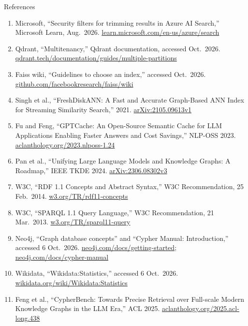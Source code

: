 \begin{frame}[allowframebreaks]{References}
\begin{enumerate}
    \item Microsoft, ``Security filters for trimming results in Azure AI Search,'' Microsoft Learn, Aug.\ 2026. \href{https://learn.microsoft.com/en-us/azure/search/search-security-trimming-for-azure-search}{learn.microsoft.com/en-us/azure/search}
    \item Qdrant, ``Multitenancy,'' Qdrant documentation, accessed Oct.\ 2026. \href{https://qdrant.tech/documentation/guides/multiple-partitions/}{qdrant.tech/documentation/guides/multiple-partitions}
    \item Faiss wiki, ``Guidelines to choose an index,'' accessed Oct.\ 2026. \href{https://github.com/facebookresearch/faiss/wiki/Guidelines-to-choose-an-index}{github.com/facebookresearch/faiss/wiki}
    \item Singh et al., ``FreshDiskANN: A Fast and Accurate Graph-Based ANN Index for Streaming Similarity Search,'' 2021. \href{https://arxiv.org/abs/2105.09613v1}{arXiv:2105.09613v1}
    \item Fu and Feng, ``GPTCache: An Open-Source Semantic Cache for LLM Applications Enabling Faster Answers and Cost Savings,'' NLP-OSS 2023. \href{https://aclanthology.org/2023.nlposs-1.24/}{aclanthology.org/2023.nlposs-1.24}
    \item Pan et al., ``Unifying Large Language Models and Knowledge Graphs: A Roadmap,'' IEEE TKDE 2024. \href{https://arxiv.org/abs/2306.08302v3}{arXiv:2306.08302v3}
    \item W3C, ``RDF 1.1 Concepts and Abstract Syntax,'' W3C Recommendation, 25 Feb.\ 2014. \href{https://www.w3.org/TR/rdf11-concepts/}{w3.org/TR/rdf11-concepts}
    \item W3C, ``SPARQL 1.1 Query Language,'' W3C Recommendation, 21 Mar.\ 2013. \href{https://www.w3.org/TR/sparql11-query/}{w3.org/TR/sparql11-query}
    \item Neo4j, ``Graph database concepts'' and ``Cypher Manual: Introduction,'' accessed 6 Oct.\ 2026. \href{https://neo4j.com/docs/getting-started/appendix/graphdb-concepts/}{neo4j.com/docs/getting-started}; \href{https://neo4j.com/docs/cypher-manual/current/introduction/}{neo4j.com/docs/cypher-manual}
    \item Wikidata, ``Wikidata:Statistics,'' accessed 6 Oct.\ 2026. \href{https://www.wikidata.org/wiki/Wikidata:Statistics}{wikidata.org/wiki/Wikidata:Statistics}
    \item Feng et al., ``CypherBench: Towards Precise Retrieval over Full-scale Modern Knowledge Graphs in the LLM Era,'' ACL 2025. \href{https://aclanthology.org/2025.acl-long.438/}{aclanthology.org/2025.acl-long.438}

\end{enumerate}
\end{frame}
